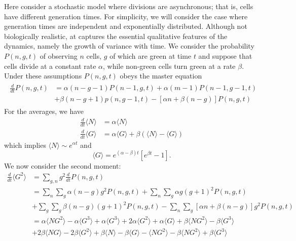 \documentclass{article}
\begin{document}
Here consider a stochastic model where divisions are asynchronous; that is, cells have different generation times. For simplicity, we will consider the case where generation times are independent and exponentially distributed. Although not biologically realistic, at captures the essential qualitative features of the dynamics, namely the growth of variance with time. We consider the probability $P(n,g,t)$ of observing $n$ cells, $g$ of which are green at time $t$ and suppose that cells divide at a constant rate $\alpha$, while non-green cells turn green at a rate $\beta$. Under these assumptions $P(n,g,t)$ obeys the master equation 
\begin{align}
\begin{split}
\frac{d}{dt}P(n,g,t) &= \alpha(n-g-1)P(n-1,g,t) + \alpha (m-1)P(n-1,g-1,t) \\
&+ \beta (n-g+1)p(n,g-1,t)- \left[\alpha n + \beta (n-g)  \right]P(n,g,t)
\end{split}
\end{align}
For the averages, we have
\begin{align}
\frac{d}{dt}\langle N  \rangle &= \alpha\langle N  \rangle \\
\frac{d}{dt}\langle G  \rangle &= \alpha\langle G  \rangle + \beta(\langle N\rangle - \langle  G\rangle)  
\end{align}
which implies $\langle N  \rangle  \sim e^{\alpha t}$ and 
\begin{equation}
\langle G \rangle = e^{(\alpha-\beta)t} \left[e^{\beta t} - 1\right].
\end{equation}
We now consider the second moment:
\begin{align}
\frac{d}{dt}\langle  G^2\rangle  &= \sum_{g,n} g^2 \frac{d}{dt}P(n,g,t)\\
&= \sum_n \sum_g \alpha (n-g) g^2 P(n,g,t) + \sum_n \sum_g \alpha g (g+1)^2 P(n,g,t)\\
&+ \sum_g \sum_g \beta (n-g)(g+1)^2 P(n,g,t) - \sum_n\sum_g \left[\alpha n + \beta(n-g) \right] g^2 P(n,g,t)\\
&= \alpha \langle  N G^2\rangle - \alpha \langle G^3 \rangle  + \alpha \langle  G^3\rangle 
  + 2 \alpha \langle  G^2\rangle  + \alpha \langle G \rangle  + \beta \langle N G^2 \rangle  - \beta \langle G^3 \rangle \\
&+ 2\beta \langle N G \rangle  - 2 \beta \langle G^2 \rangle  + \beta \langle  N\rangle  - \beta \langle  G\rangle 
 - \langle N G^2 \rangle - \beta \langle  N G^2\rangle  + \beta \langle G^3\rangle 
\end{align}
\end{document}
